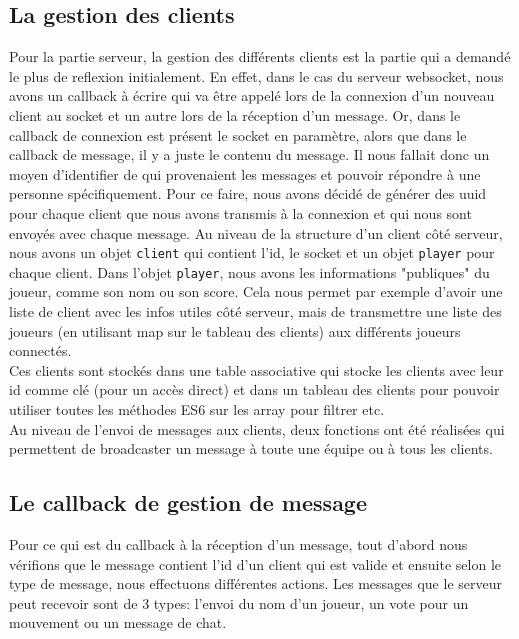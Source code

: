 \documentclass{article}
\begin{document}
\subsection{La gestion des clients}
Pour la partie serveur, la gestion des différents clients est la partie qui a demandé le plus de reflexion initialement. En effet, dans le cas du serveur websocket, nous avons un callback à écrire qui va être appelé lors de la connexion d'un nouveau client au socket et un autre lors de la réception d'un message. Or, dans le callback de connexion est présent le socket en paramètre, alors que dans le callback de message, il y a juste le contenu du message. Il nous fallait donc un moyen d'identifier de qui provenaient les messages et pouvoir répondre à une personne spécifiquement. Pour ce faire, nous avons décidé de générer des uuid pour chaque client que nous avons transmis à la connexion et qui nous sont envoyés avec chaque message. Au niveau de la structure d'un client côté serveur, nous avons un objet \verb+client+ qui contient l'id, le socket et un objet \verb+player+ pour chaque client. Dans l'objet \verb+player+, nous avons les informations "publiques" du joueur, comme son nom ou son score. Cela nous permet par exemple d'avoir une liste de client avec les infos utiles côté serveur, mais de transmettre une liste des joueurs (en utilisant map sur le tableau des clients) aux différents joueurs connectés. \\

Ces clients sont stockés dans une table associative qui stocke les clients avec leur id comme clé (pour un accès direct) et dans un tableau des clients pour pouvoir utiliser toutes les méthodes ES6 sur les array pour filtrer etc. \\

Au niveau de l'envoi de messages aux clients, deux fonctions ont été réalisées qui permettent de broadcaster un message à toute une équipe ou à tous les clients.

\subsection{Le callback de gestion de message}
Pour ce qui est du callback à la réception d'un message, tout d'abord nous vérifions que le message contient l'id d'un client qui est valide et ensuite selon le type de message, nous effectuons différentes actions. Les messages que le serveur peut recevoir sont de 3 types: l'envoi du nom d'un joueur, un vote pour un mouvement ou un message de chat. \\
\end{document}
